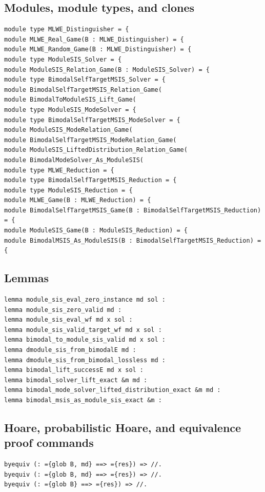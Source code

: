 \subsection*{Modules, module types, and clones}
\begin{lstlisting}[language=EasyCrypt,basicstyle=\ttfamily\tiny]
module type MLWE_Distinguisher = {
module MLWE_Real_Game(B : MLWE_Distinguisher) = {
module MLWE_Random_Game(B : MLWE_Distinguisher) = {
module type ModuleSIS_Solver = {
module ModuleSIS_Relation_Game(B : ModuleSIS_Solver) = {
module type BimodalSelfTargetMSIS_Solver = {
module BimodalSelfTargetMSIS_Relation_Game(
module BimodalToModuleSIS_Lift_Game(
module type ModuleSIS_ModeSolver = {
module type BimodalSelfTargetMSIS_ModeSolver = {
module ModuleSIS_ModeRelation_Game(
module BimodalSelfTargetMSIS_ModeRelation_Game(
module ModuleSIS_LiftedDistribution_Relation_Game(
module BimodalModeSolver_As_ModuleSIS(
module type MLWE_Reduction = {
module type BimodalSelfTargetMSIS_Reduction = {
module type ModuleSIS_Reduction = {
module MLWE_Game(B : MLWE_Reduction) = {
module BimodalSelfTargetMSIS_Game(B : BimodalSelfTargetMSIS_Reduction) = {
module ModuleSIS_Game(B : ModuleSIS_Reduction) = {
module BimodalMSIS_As_ModuleSIS(B : BimodalSelfTargetMSIS_Reduction) = {
\end{lstlisting}

\subsection*{Lemmas}
\begin{lstlisting}[language=EasyCrypt,basicstyle=\ttfamily\tiny]
lemma module_sis_eval_zero_instance md sol :
lemma module_sis_zero_valid md :
lemma module_sis_eval_wf md x sol :
lemma module_sis_valid_target_wf md x sol :
lemma bimodal_to_module_sis_valid md x sol :
lemma dmodule_sis_from_bimodalE md :
lemma dmodule_sis_from_bimodal_lossless md :
lemma bimodal_lift_successE md x sol :
lemma bimodal_solver_lift_exact &m md :
lemma bimodal_mode_solver_lifted_distribution_exact &m md :
lemma bimodal_msis_as_module_sis_exact &m :
\end{lstlisting}

\subsection*{Hoare, probabilistic Hoare, and equivalence proof commands}
\begin{lstlisting}[language=EasyCrypt,basicstyle=\ttfamily\tiny]
byequiv (: ={glob B, md} ==> ={res}) => //.
byequiv (: ={glob B, md} ==> ={res}) => //.
byequiv (: ={glob B} ==> ={res}) => //.
\end{lstlisting}

